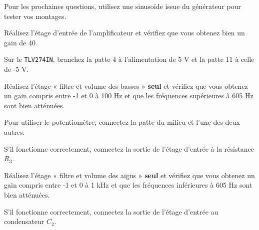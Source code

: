 
Pour les prochaines questions, utilisez une sinusoïde issue du générateur pour tester vos montages.
{
	Réalisez l'étage d'entrée de l'amplificateur et vérifiez que vous obtenez bien un gain de 40.
	\begin{astuce}
		Sur le \texttt{TLV274IN}, branchez la patte 4 à l'alimentation de 5 V et la patte 11 à celle de -5 V.
	\end{astuce}
}
{}

{
	Réalisez l'étage « filtre et volume des basses » \textbf{seul} et vérifiez que vous obtenez un gain compris entre -1 et 0 à 100 Hz et que les fréquences supérieures à 605 Hz sont bien atténuées.

	\begin{astuce}
		Pour utiliser le potentiomètre, connectez la patte du milieu et l'une des deux autres.
	\end{astuce}

	S'il fonctionne correctement, connectez la sortie de l'étage d'entrée à la résistance $R_3$.
}
{}

{
	Réalisez l'étage « filtre et volume des aigus » \textbf{seul} et vérifiez que vous obtenez un gain compris entre -1 et 0 à 1 kHz et que les fréquences inférieures à 605 Hz sont bien atténuées.

	S'il fonctionne correctement, connectez la sortie de l'étage d'entrée au condensateur $C_2$.
}
{}

